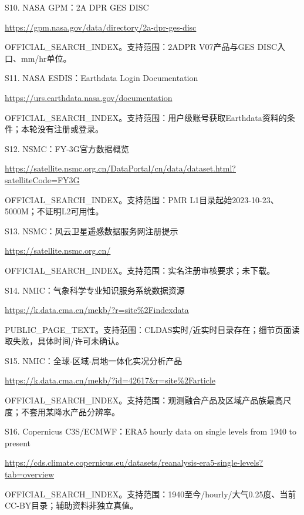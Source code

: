 \documentclass[UTF8,fontset=fandol,10pt]{ctexart}
\begin{document}
S10. NASA GPM：2A DPR GES DISC\par\url{https://gpm.nasa.gov/data/directory/2a-dpr-ges-disc}\par OFFICIAL\_\allowbreak{}SEARCH\_\allowbreak{}INDEX。支持范围：2ADPR V07产品与GES DISC入口、mm/\allowbreak{}hr单位。\par\medskip

S11. NASA ESDIS：Earthdata Login Documentation\par\url{https://urs.earthdata.nasa.gov/documentation}\par OFFICIAL\_\allowbreak{}SEARCH\_\allowbreak{}INDEX。支持范围：用户级账号获取Earthdata资料的条件；本轮没有注册或登录。\par\medskip

S12. NSMC：FY-3G官方数据概览\par\url{https://satellite.nsmc.org.cn/DataPortal/cn/data/dataset.html?satelliteCode=FY3G}\par OFFICIAL\_\allowbreak{}SEARCH\_\allowbreak{}INDEX。支持范围：PMR L1目录起始2023-10-23、5000M；不证明L2可用性。\par\medskip

S13. NSMC：风云卫星遥感数据服务网注册提示\par\url{https://satellite.nsmc.org.cn/}\par OFFICIAL\_\allowbreak{}SEARCH\_\allowbreak{}INDEX。支持范围：实名注册审核要求；未下载。\par\medskip

S14. NMIC：气象科学专业知识服务系统数据资源\par\url{https://k.data.cma.cn/mekb/?r=site\%2Findexdata}\par PUBLIC\_\allowbreak{}PAGE\_\allowbreak{}TEXT。支持范围：CLDAS实时/\allowbreak{}近实时目录存在；细节页面读取失败，具体时间/\allowbreak{}许可未确认。\par\medskip

S15. NMIC：全球-区域-局地一体化实况分析产品\par\url{https://k.data.cma.cn/mekb/?id=42617&r=site\%2Farticle}\par OFFICIAL\_\allowbreak{}SEARCH\_\allowbreak{}INDEX。支持范围：观测融合产品及区域产品族最高尺度；不套用某降水产品分辨率。\par\medskip

S16. Copernicus C3S/\allowbreak{}ECMWF：ERA5 hourly data on single levels from 1940 to present\par\url{https://cds.climate.copernicus.eu/datasets/reanalysis-era5-single-levels?tab=overview}\par OFFICIAL\_\allowbreak{}SEARCH\_\allowbreak{}INDEX。支持范围：1940至今/\allowbreak{}hourly/\allowbreak{}大气0.25度、当前CC-BY目录；辅助资料非独立真值。\par\medskip
\end{document}

